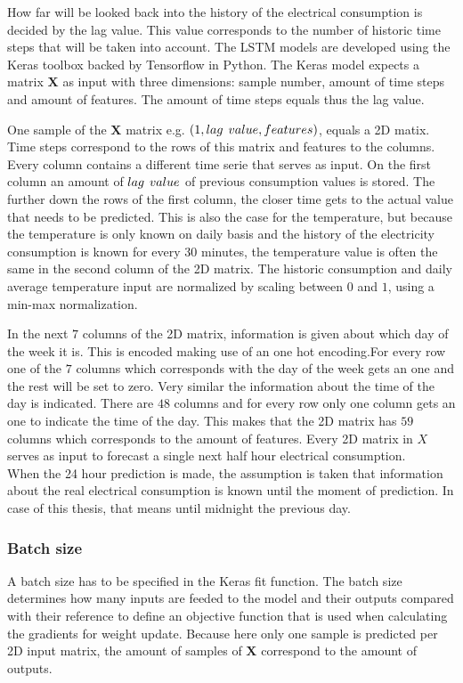 How far will be looked back into the history of the electrical consumption is decided by the lag value. This value corresponds to the number of historic time steps that will be taken into account. The LSTM models are developed using the Keras toolbox backed by Tensorflow in Python. The Keras model expects a matrix $ \bm{X} $ as input with three dimensions: sample number, amount of time steps and amount of features. The amount of time steps equals thus the lag value. 

One sample of the $ \bm{X} $ matrix e.g. $ (1,lag\hspace{1.5mm}value, features) $, equals a 2D matix. Time steps correspond to the rows of this matrix and features to the columns. Every column contains a different time serie that serves as input. On the first column an amount of $ lag\hspace{1.5mm}value $ of previous consumption values is stored. The further down the rows of the first column, the closer time gets to the actual value that needs to be predicted. This is also the case for the temperature, but because the temperature is only known on daily basis and the history of the electricity consumption is known for every 30 minutes, the temperature value is often the same in the second column of the 2D matrix. The historic consumption and daily average temperature input are normalized by scaling between $ 0 $ and $ 1 $, using a min-max normalization.

In the next $ 7 $ columns of the 2D matrix, information is given about which day of the week it is. This is encoded making use of an one hot encoding.For every row one of the $ 7 $ columns which corresponds with the day of the week gets an one and the rest will be set to zero. Very similar the information about the time of the day is indicated. There are $ 48 $ columns and for every row only one column gets an one to indicate the time of the day. This makes that the 2D matrix has $ 59  $ columns which corresponds to the amount of features. Every 2D matrix in $ X $ serves as input to forecast a single next half hour electrical consumption.\\

When the 24 hour prediction is made, the assumption is taken that information about the real electrical consumption is known until the moment of prediction. In case of this thesis, that means until midnight the previous day. 

\subsubsection{Batch size}
A batch size has to be specified in the Keras fit function. The batch size determines how many inputs are feeded to the model and their outputs compared with their reference to define an objective function that is used when calculating the gradients for weight update. Because here only one sample is predicted per 2D input matrix, the amount of samples of $ \bm{X} $ correspond to the amount of outputs.\\

